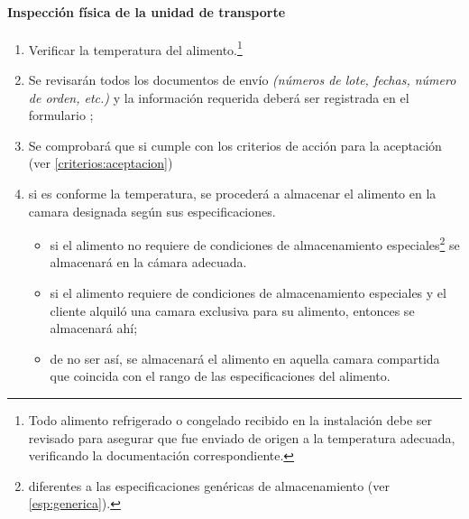 \paragraph{Inspección física de la unidad de transporte}\label{sec:InspeccionTransporte}
\begin{enumerate}
\item Verificar la temperatura del alimento.\footnote{Todo alimento refrigerado o congelado recibido en la instalación debe ser revisado para asegurar que fue enviado de origen a la temperatura adecuada, verificando la documentación correspondiente.}
    \item Se revisarán todos los documentos de envío \emph{(números de lote, fechas, número de orden, etc.)} y la información requerida deberá ser registrada en el formulario \Oent;
    \item Se comprobará que si cumple con los criterios de acción para la aceptación (ver \cref{criterios:aceptacion})
    \item si es conforme la temperatura, se procederá a almacenar el alimento en la camara designada según sus especificaciones.
          \begin{itemize}
              \item si el \gls{alimento} no requiere de condiciones de almacenamiento especiales\footnote{diferentes a las especificaciones genéricas de almacenamiento (ver \cref{esp:generica}).} se almacenará en la cámara adecuada.
              \item si el \gls{alimento} requiere de condiciones de almacenamiento especiales y el cliente alquiló una camara exclusiva para su alimento, entonces se almacenará ahí;
              \item de no ser así, se almacenará el \gls{alimento} en aquella camara compartida que coincida con el rango de las especificaciones del alimento.
          \end{itemize}
\end{enumerate}